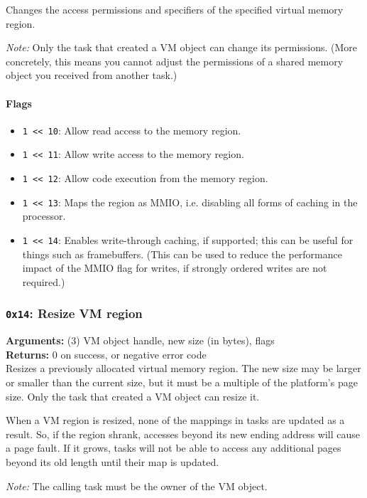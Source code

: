 \documentclass[11pt]{article}
\begin{document}
Changes the access permissions and specifiers of the specified virtual memory region.

\textit{Note:} Only the task that created a VM object can change its permissions. (More concretely, this means you cannot adjust the permissions of a shared memory object you received from another task.)

\paragraph{Flags}
\begin{itemize}
\item \texttt{1 << 10}: Allow read access to the memory region.
\item \texttt{1 << 11}: Allow write access to the memory region.
\item \texttt{1 << 12}: Allow code execution from the memory region.
\item \texttt{1 << 13}: Maps the region as MMIO, i.e. disabling all forms of caching in the processor.
\item \texttt{1 << 14}: Enables write-through caching, if supported; this can be useful for things such as framebuffers. (This can be used to reduce the performance impact of the MMIO flag for writes, if strongly ordered writes are not required.)
\end{itemize}

\subsubsection{{\tt 0x14}: Resize VM region}
\textbf{Arguments:} (3) VM object handle, new size (in bytes), flags \\
\textbf{Returns:} 0 on success, or negative error code \\

Resizes a previously allocated virtual memory region. The new size may be larger or smaller than the current size, but it must be a multiple of the platform's page size. Only the task that created a VM object can resize it.

When a VM region is resized, none of the mappings in tasks are updated as a result. So, if the region shrank, accesses beyond its new ending address will cause a page fault. If it grows, tasks will not be able to access any additional pages beyond its old length until their map is updated.

\textit{Note:} The calling task must be the owner of the VM object.
\end{document}
